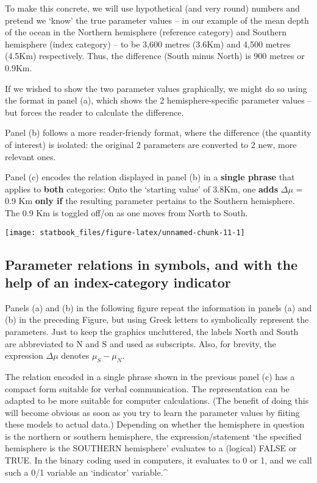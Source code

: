 \documentclass[]{book}
\begin{document}
To make this concrete, we will use hypothetical (and very round) numbers and pretend we `know' the true parameter values -- in our example
of the mean depth of the ocean in the Northern hemisphere (reference category) and Southern hemisphere (index category) -- to be 3,600 metres (3.6Km) and 4,500 metres (4.5Km) respectively. Thus, the difference (South minus North) is 900 metres or 0.9Km.

If we wished to show the two parameter values graphically, we might do so using the format in panel (a), which shows the 2 hemisphere-specific parameter values -- but forces the reader to calculate the difference.

Panel (b) follows a more reader-friendy format, where the difference (the quantity of interest) is isolated: the original 2 parameters are converted to 2 new, more relevant ones.

Panel (c) encodes the relation displayed in panel (b) in a \textbf{single phrase} that applies to \textbf{both} categories: Onto the `starting value' of 3.8Km, one \textbf{adds} \(\Delta \mu\) = 0.9 Km \textbf{only if} the resulting parameter pertains to the Southern hemisphere. The 0.9 Km is toggled off/on as one moves from North to South.

\begin{center}\texttt{[image: statbook\_files/figure-latex/unnamed-chunk-11-1]} \end{center}

\hypertarget{parameter-relations-in-symbols-and-with-the-help-of-an-index-category-indicator-1}{%
\subsection{Parameter relations in symbols, and with the help of an index-category indicator}\label{parameter-relations-in-symbols-and-with-the-help-of-an-index-category-indicator-1}}

Panels (a) and (b) in the following figure repeat the information in panels (a) and (b) in the preceding Figure, but using Greek letters to symbolically represent the parameters. Just to keep the graphics uncluttered, the labels North and South are abbreviated to N and S and used as subscripts. Also, for brevity, the expression \(\Delta \mu\) denotes \(\mu_S - \mu_N\).

The relation encoded in a single phrase shown in the previous panel (c) has a compact form suitable for verbal communication. The representation can be adapted to be more suitable for computer calculations. (The benefit of doing this will become obvious as soon as you try to learn the parameter values by fiiting these models to actual data.) Depending on whether the hemisphere in question is the northern or southern hemisphere, the expression/statement `the specified hemisphere is the SOUTHERN hemisphere' evaluates to a (logical) FALSE or TRUE. In the binary coding used in computers, it evaluates to 0 or 1, and we call such a 0/1 variable an `indicator' variable.\^{}
\end{document}
